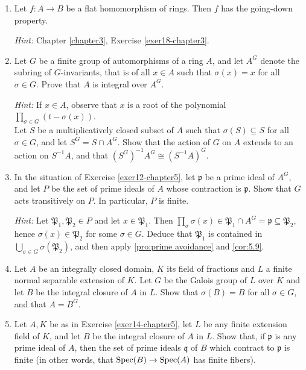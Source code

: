 \begin{enumerate}
    \item \label{exer11-chapter5} Let $f \colon A \to B$ be a flat homomorphism of rings. Then $f$ has the going-down property.
    
    \textit{Hint:} Chapter \ref{chapter3}, Exercise \ref{exer18-chapter3}.

    \item \label{exer12-chapter5} Let $G$ be a finite group of automorphisms of a ring $A$, and let $A^G$ denote the subring of $G$-invariants, that is of all $x \in A$ such that $\sigma(x) = x$ for all $\sigma \in G$. Prove that $A$ is integral over $A^G$.

    \textit{Hint:} If $x \in A$, observe that $x$ is a root of the polynomial $\prod_{\sigma \in G} (t - \sigma(x))$.\\
    Let $S$ be a multiplicatively closed subset of $A$ such that $\sigma(S) \subseteq S$ for all $\sigma \in G$, and let $S^G = S \cap A^G$. Show that the action of $G$ on $A$ extends to an action on $S^{-1}A$, and that $(S^G)^{-1}A^G \cong (S^{-1}A)^G$.

    \item \label{exer13-chapter5}In the situation of Exercise \ref{exer12-chapter5}, let $\mathfrak{p}$ be a prime ideal of $A^G$, and let $P$ be the set of prime ideals of $A$ whose contraction is $\mathfrak{p}$. Show that $G$ acts transitively on $P$. In particular, $P$ is finite.

    \textit{Hint:} Let $\mathfrak{P}_1, \mathfrak{P}_2 \in P$ and let $x \in \mathfrak{P}_1$. Then $\prod_{\sigma} \sigma(x) \in \mathfrak{P}_1 \cap A^G = \mathfrak{p} \subseteq \mathfrak{P}_2$, hence $\sigma(x) \in \mathfrak{P}_2$ for some $\sigma \in G$. Deduce that $\mathfrak{P}_1$ is contained in $\bigcup_{\sigma \in G} \sigma(\mathfrak{P}_2)$, and then apply \eqref{pro:prime avoidance} and \eqref{cor:5.9}.

    \item \label{exer14-chapter5} Let $A$ be an integrally closed domain, $K$ its field of fractions and $L$ a finite normal separable extension of $K$. Let $G$ be the Galois group of $L$ over $K$ and let $B$ be the integral closure of $A$ in $L$. Show that $\sigma(B) = B$ for all $\sigma \in G$, and that $A = B^G$.

    \item \label{exer15-chapter5} Let $A, K$ be as in Exercise \ref{exer14-chapter5}, let $L$ be any finite extension field of $K$, and let $B$ be the integral closure of $A$ in $L$. Show that, if $\mathfrak{p}$ is any prime ideal of $A$, then the set of prime ideals $\mathfrak{q}$ of $B$ which contract to $\mathfrak{p}$ is finite (in other words, that $\operatorname{Spec}(B) \to \operatorname{Spec}(A)$ has finite fibers).


\end{enumerate}
